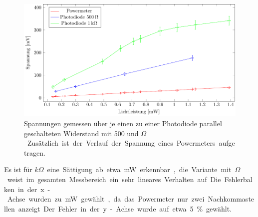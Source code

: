 \begin{figure} [ht]
	\centering
	\includegraphics[width=1\linewidth]{graphs/fotodiode/diode.pdf}
	\caption[Vermessung einer Photodiode]{
			Spannungen gemessen über je einen zu einer Photodiode parallel geschalteten Widerstand mit 500 und \unit[1000]{$\Omega$}. Zusätzlich ist der Verlauf der Spannung eines Powermeters aufgetragen.
		}
	\label{fig:photodiode}
\end{figure}

Es ist für \unit[1]{$k\Omega$} eine Sättigung ab etwa \unit[0,9]{mW} erkennbar, die Variante mit \unit[500]{$\Omega$} weist im gesamten Messbereich ein sehr lineares Verhalten auf. Die Fehlerbalken in der x-Achse wurden zu \unit[0,01]{mW} gewählt, da das Powermeter nur zwei Nachkommastellen anzeigt. Der Fehler in der y-Achse wurde auf etwa 5\% gewählt.